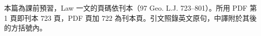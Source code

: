 本篇為課前預習，Law 一文的頁碼依刊本（97 Geo. L.J. 723--801）。所用 PDF 第 1 頁即刊本 723 頁，PDF 頁加 722 為刊本頁。引文照錄英文原句，中譯附於其後的方括號內。
